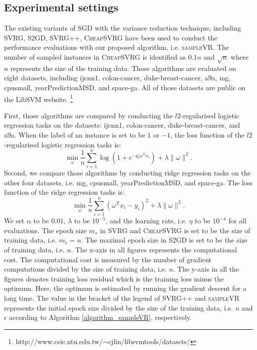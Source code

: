\documentclass[letterpaper]{article}
\begin{document}
\subsection{Experimental settings}
\label{sect_experimental_settings}
The existing variants of SGD with the variance reduction technique, including SVRG, S2GD, SVRG++, \textsc{CheapSVRG} have been used to conduct the performance evaluations with our proposed algorithm, i.e. \textsc{sampleVR}. The number of sampled instances in \textsc{CheapSVRG} is identified as $0.1n$ and $\sqrt{n}$ where $n$ represents the size of the training data.
Those algorithms are evaluated on eight datasets, including ijcnn1, colon-cancer, duke-breast-cancer, a9a, mg, cpusmall, yearPredictionMSD, and space-ga. All of those datasets are public on the LibSVM website. \footnote{http://www.csie.ntu.edu.tw/$\sim$cjlin/libsvmtools/datasets/} 

First, those algorithms are compared by conducting the $l2$-regularised logistic regression tasks on the datasets: ijcnn1, colon-cancer, duke-breast-cancer, and a9a. When the label of an instance is set to be $1$ or $-1$, the loss function of the $l2$-regularised logistic regression tasks is:
$$
\min\limits_\omega \frac{1}{n}\sum\limits_{i=1}^n \log(1+e^{-y_i \omega^\mathrm{T} x_i }) + \lambda \parallel \omega \parallel^2.
$$ Second, we compare those algorithms by conducting ridge regression tasks on the other four datasets, i.e. mg, cpusmall, yearPredictionMSD, and space-ga. The loss function of the ridge regression tasks is:
$$
\min\limits_\omega \frac{1}{n}\sum\limits_{i=1}^n\left(\omega^{\mathrm{T}}x_i-y_i\right)^2 + \lambda \parallel \omega \parallel^2.
$$ We set $\alpha$ to be $0.01$, $\lambda$ to be $10^{-5}$, and the learning rate, i.e. $\eta$ to be $10^{-4}$ for all evaluations.  The epoch size $m_s$ in SVRG and \textsc{CheapSVRG} is set to be the size of training data, i.e. $m_s\mathrm{=}n$. The maximal epoch size in S2GD is set to be the size of training data, i.e. $n$.    The x-axis in all  figures represents the computational cost. The computational cost is measured by the number of gradient computations divided by  the size of training data, i.e. $n$. The y-axis in all the figures denotes training loss residual which is the training loss minus the optimum. Here, the optimum is estimated by running the gradient descent for a long time. The value in the bracket of the legend of SVRG++ and \textsc{sampleVR} represents the initial epoch size divided by the size of the training data, i.e. $n$ and $\epsilon$ according to Algorithm \ref{algorithm_sampleVR}, respectively.
\end{document}
